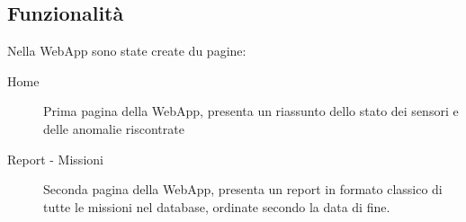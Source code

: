 \subsection{Funzionalità}
Nella WebApp sono state create du pagine:
\begin{description}
\item[Home] Prima pagina della WebApp, presenta un riassunto dello
  stato dei sensori e delle anomalie riscontrate
\item[Report - Missioni] Seconda pagina della WebApp, presenta un report
  in formato classico di tutte le missioni nel database, ordinate secondo
  la data di fine.
\end{description}


